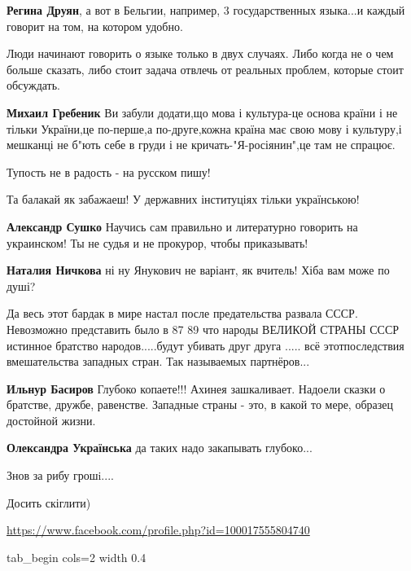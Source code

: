 \begin{itemize}
\begin{itemize}
\textbf{Регина Друян}, а вот в Бельгии, например, 3 государственных языка...и каждый говорит на том, на котором удобно.
\end{itemize}


Люди начинают говорить о языке только в двух случаях. Либо когда не о чем
больше сказать, либо стоит задача отвлечь от реальных проблем, которые стоит
обсуждать.


\textbf{Михаил Гребеник} Ви забули додати,що мова і культура-це основа країни і
не тільки України,це по-перше,а по-друге,кожна країна має свою мову і
культуру,і мешканці не б"ють себе в груди і не кричать-"Я-росіянин",це там не
спрацює.

Тупость не в радость - на русском пишу!

Та балакай як забажаеш!
У державних інституціях тільки українською!

\textbf{Александр Сушко} Научись сам правильно и литературно говорить на
украинском! Ты не судья и не прокурор, чтобы приказывать!

\textbf{Наталия Ничкова} ні ну Янукович не варіант, як вчитель!
Хіба вам може по душі?


Да весь этот бардак в мире настал после предательства развала СССР. Невозможно
представить было в 87 89 что народы ВЕЛИКОЙ СТРАНЫ СССР истинное братство
народов.....будут убивать друг друга ..... всё этотпоследствия вмешательства
западных стран. Так называемых партнёров...


\textbf{Ильнур Басиров} Глубоко копаете!!! Ахинея зашкаливает. Надоели сказки о
братстве, дружбе, равенстве. Западные страны - это, в какой то мере, образец достойной
жизни.

\textbf{Олександра Українська} да таких надо закапывать глубоко...

Знов за рибу грошi....

Досить скіглити)

\url{https://www.facebook.com/profile.php?id=100017555804740}

\ifcmt
  tab_begin cols=2
		 width 0.4


\end{itemize}
